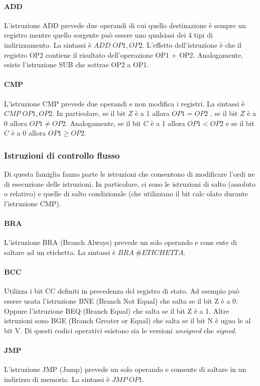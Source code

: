 \documentclass{article}
\begin{document}
\paragraph{ADD} L'istruzione ADD prevede due operandi di cui quello destinazione
è sempre un registro mentre quello sorgente può essere uno qualsiasi dei 4 tipi 
di indirizzamento. La sintassi è $ADD\;OP1,OP2$. 
L'effetto dell'istruzione è che il registro OP2 contiene il risultato 
dell'operazione OP1 + OP2. Analogamente, esiste l'istruzione SUB che 
sottrae OP2 a OP1.

\paragraph{CMP} L'istruzione CMP prevede due operandi e non modifica i registri.
La sintassi è $CMP\;OP1,OP2$. In particolare, se il bit $Z$ è a 1 allora $OP1=OP2$
, se il bit $Z$ è a 0 allora $OP1\neq OP2$. Analogamente, se il bit $C$ è a 1 allora 
$OP1<OP2$ e se il bit $C$ è a 0 allora $OP1\geq OP2$.

\subsubsection{Istruzioni di controllo flusso}
Di questa famiglia fanno parte le istruzioni che consentono di modificare l'ordi
ne
di esecuzione delle istruzioni. In particolare, ci sono le istruzioni di salto 
(assoluto o relativo) e quelle di salto condizionale (che utilizzano il bit calc
olato
durante l'istruzione CMP).

\paragraph{BRA} L'istruzione BRA (Branch Always) prevede un solo operando e cons
ente 
di saltare ad un etichetta. La sintassi è $BRA\;\#ETICHETTA$.

\paragraph{BCC} Utilizza i bit CC definiti in precedenza del registro di stato.
Ad esempio può essere usata l'istruzione BNE (Branch Not Equal) che salta se il 
bit Z è a 0.
Oppure l'istruzione BEQ (Branch Equal) che salta se il bit Z è a 1.
Altre istruzioni sono BGE (Branch Greater or Equal) che salta se il bit N è ugua
le al bit V. Di questi codici operativi esistono sia le versioni \textit{unsigned} 
che \textit{signed}.

\paragraph{JMP} L'istruzione JMP (Jump) prevede un solo operando e consente di
saltare in un indirizzo di memoria. La sintassi è $JMP\;OP1$.
\end{document}
